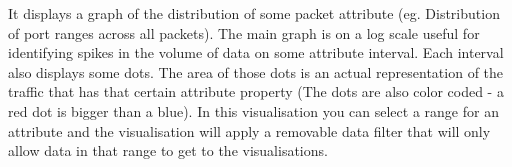 It displays a graph of the distribution of some packet attribute (eg. Distribution of port ranges across all packets). 
The main graph is on a log scale useful for identifying spikes in the volume of data on some attribute interval. 
Each interval also displays some dots. The area of those dots is an actual representation of the traffic that has that certain attribute property (The dots are also color coded - a red dot is bigger than a blue). 
In this visualisation you can select a range for an attribute and the visualisation will apply a removable data filter that will only allow data in that range to get to the visualisations.

